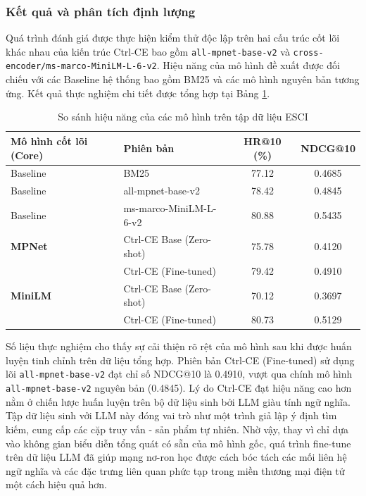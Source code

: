 \subsubsection*{Kết quả và phân tích định lượng}
Quá trình đánh giá được thực hiện kiểm thử độc lập trên hai cấu trúc cốt lõi khác nhau của kiến trúc Ctrl-CE bao gồm \texttt{all-mpnet-base-v2} và \texttt{cross-encoder/ms-marco-MiniLM-L-6-v2}. Hiệu năng của mô hình đề xuất được đối chiếu với các Baseline hệ thống bao gồm BM25 và các mô hình nguyên bản tương ứng. Kết quả thực nghiệm chi tiết được tổng hợp tại Bảng \ref{tab:ablation_esci}.

\begin{table}[htbp]
\centering
\caption{So sánh hiệu năng của các mô hình trên tập dữ liệu ESCI}
\label{tab:ablation_esci}
\begin{tabularx}{\textwidth}{l|l|cc}
\toprule
\textbf{Mô hình cốt lõi (Core)} & \textbf{Phiên bản} & \textbf{HR@10 (\%)} & \textbf{NDCG@10} \\ \midrule
Baseline & BM25 & 77.12 & 0.4685 \\
Baseline & all-mpnet-base-v2 & 78.42 & 0.4845 \\
Baseline & ms-marco-MiniLM-L-6-v2 & 80.88 & 0.5435 \\ \midrule
\textbf{MPNet} & Ctrl-CE Base (Zero-shot) & 75.78 & 0.4120 \\
 & Ctrl-CE (Fine-tuned) & 79.42 & 0.4910 \\ \midrule
\textbf{MiniLM} & Ctrl-CE Base (Zero-shot) & 70.12 & 0.3697 \\
 & Ctrl-CE (Fine-tuned) & 80.73 & 0.5129 \\ \bottomrule
\end{tabularx}
\end{table}

Số liệu thực nghiệm cho thấy sự cải thiện rõ rệt của mô hình sau khi được huấn luyện tinh chỉnh trên dữ liệu tổng hợp. Phiên bản Ctrl-CE (Fine-tuned) sử dụng lõi \texttt{all-mpnet-base-v2} đạt chỉ số NDCG@10 là 0.4910, vượt qua chính mô hình \texttt{all-mpnet-base-v2} nguyên bản (0.4845). Lý do Ctrl-CE đạt hiệu năng cao hơn nằm ở chiến lược huấn luyện trên bộ dữ liệu sinh bởi LLM giàu tính ngữ nghĩa. Tập dữ liệu sinh vởi LLM này đóng vai trò như một trình giả lập ý định tìm kiếm, cung cấp các cặp truy vấn - sản phẩm tự nhiên. Nhờ vậy, thay vì chỉ dựa vào không gian biểu diễn tổng quát có sẵn của mô hình gốc, quá trình fine-tune trên dữ liệu LLM đã giúp mạng nơ-ron học được cách bóc tách các mối liên hệ ngữ nghĩa và các đặc trưng liên quan phức tạp trong miền thương mại điện tử một cách hiệu quả hơn.

